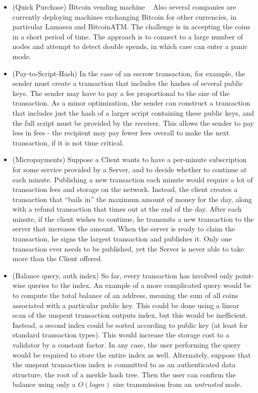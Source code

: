 \begin{itemize}
\item (Quick Purchase) Bitcoin vending machine ~\cite{bitcoinsnack} Also several companies are currently deploying machines exchanging Bitcoin for other currencies, in particular Lamassu and BitcoinATM. The challenge is in accepting the coins in a short period of time. The approach is to connect to a large number of nodes and attempt to detect double spends, in which case can enter a panic mode.

\item (Pay-to-Script-Hash) In the case of an escrow transaction, for example, the sender must create a transaction that includes the hashes of several public keys. The sender may have to pay a fee proportional to the size of the transaction. As a minor optimization, the sender can construct a transaction that includes just the hash of a larger script containing these public keys, and the full script must be provided by the receiver. This allows the sender to pay less in fees - the recipient may pay fewer fees overall to make the next transaction, if it is not time critical.
\item (Micropayments) Suppose a Client wants to have a per-minute subscription for some service provided by a Server, and to decide whether to continue at each minute. Publishing a new transaction each minute would require a lot of transaction fees and storage on the network. Instead, the client creates a transaction that ``bails in'' the maximum amount of money for the day, along with a refund transaction that times out at the end of the day. After each minute, if the client wishes to continue, he transmits a new transaction to the server that increases the amount. When the server is ready to claim the transaction, he signs the largest transaction and publishes it. Only one transaction ever needs to be published, yet the Server is never able to take more than the Client offered.
\item (Balance query, auth index) So far, every transaction has involved only point-wise queries to the index. An example of a more complicated query would be to compute the total balance of an address, meaning the sum of all coins associated with a particular public key. This could be done using a linear scan of the unspent transaction outputs index, but this would be inefficient. Instead, a second index could be sorted according to public key (at least for standard transaction types). This would increase the storage cost to a validator by a constant factor. In any case, the user performing the query would be required to store the entire index as well. Alternately, suppose that the unspent transaction index is committed to as an authenticated data structure, the root of a merkle hash tree. Then the user can confirm the balance using only a $O(log m)$ size transmission from an {\em untrusted} node.
\end{itemize}

